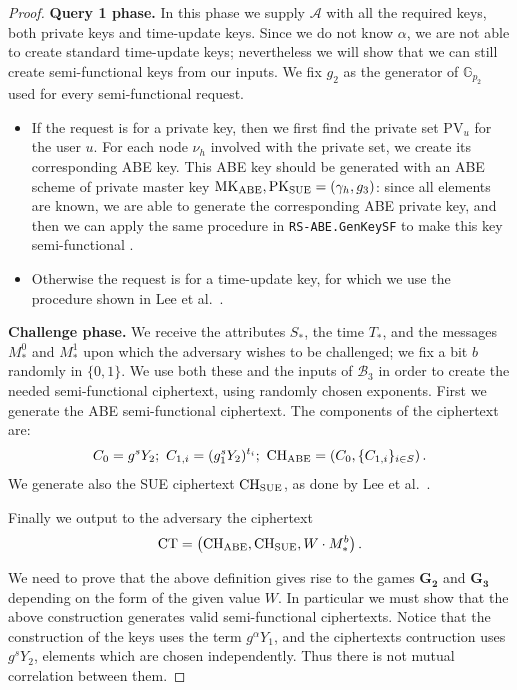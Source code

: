 \documentclass[a4paper,10pt]{article}
\newcommand{\G}{\mathbb{G}}
\newcommand{\algorithm}[2]{\texttt{#1.#2}}
\newcommand{\game}[2]{$\mathbf{#1_{#2}}$}
\newcommand{\phase}[1]{\textbf{#1 phase.} \hspace{0pt}}
\begin{document}
\begin{proof}
	\phase{Query 1}
	In this phase we supply $\mathcal{A}$ with all the required keys, both private keys and time-update keys. Since we do not know $\alpha$, we are not able to create standard time-update keys; nevertheless we will show that we can still create semi-functional keys from our inputs. We fix $g_2$ as the generator of $\G_{p_2}$ used for every semi-functional request.
	\begin{itemize}
		\item
		If the request is for a private key, then we first find the private set $\mathrm{PV}_u$ for the user $u$. For each node $\nu_h$ involved with the private set, we create its corresponding ABE key. This ABE key should be generated with an ABE scheme of private master key $\mathrm{MK}_{\textnormal{ABE}}, \mathrm{PK}_{\textnormal{SUE}}=(\gamma_h,g_3)$: since all elements are known, we are able to generate the corresponding ABE private key, and then we can apply the same procedure in \algorithm{RS-ABE}{GenKeySF} to make this key semi-functional .
		\item
		Otherwise the request is for a time-update key, for which we use the procedure shown in Lee et al.~\cite{lee2013RSABE}.
		
	\end{itemize}
	
	\phase{Challenge}
	We receive the attributes $S_*$, the time $T_*$, and the messages $M_*^0$ and $M_*^1$ upon which the adversary wishes to be challenged; we fix a bit $b$ randomly in $\{0,1\}$.
	We use both these and the inputs of $\mathscr{B}_3$ in order to create the needed semi-functional ciphertext, using randomly chosen exponents.
	First we generate the ABE semi-functional ciphertext.
	The components of the ciphertext are:
		\begin{align*}
			C_0=g^s Y_2;\ 
			C_{1,i}=(g_1^s Y_2)^{t_i};\ 
			\mathrm{CH}_\textnormal{ABE}=\left(C_0,\{C_{1,i}\}_{i\in S}\right).
		\end{align*}
	We generate also the SUE ciphertext $\mathrm{CH}_\textnormal{SUE}$, as done by Lee et al.~\cite{lee2013RSABE}.
	
	Finally we output to the adversary the ciphertext
	\[
		\mathrm{CT}=\left(\mathrm{CH}_\textnormal{ABE},\mathrm{CH}_\textnormal{SUE},W\cdot M_*^b\right).
	\]
	
	We need to prove that the above definition gives rise to the games \game{G}{2} and \game{G}{3} depending on the form of the given value $W$. In particular we must show that the above construction generates valid semi-functional ciphertexts. Notice that the construction of the keys uses the term $g^\alpha Y_1$, and the ciphertexts contruction uses $g^s Y_2$, elements which are chosen independently. Thus there is not mutual correlation between them.
	

\end{proof}
\end{document}
